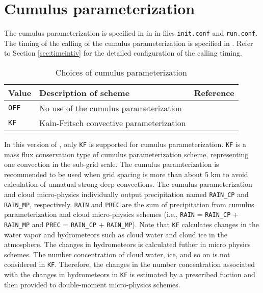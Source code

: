 
\section{Cumulus parameterization} \label{sec:basic_usel_cumulus}

The cumulus parameterization is specified in  in  in files \verb|init.conf| and \verb|run.conf|. The timing of the calling of the cumulus parameterization is specified in . Refer to Section \ref{sec:timeintiv} for the detailed configuration of the calling timing.

\begin{table}[h]
\begin{center}
  \caption{Choices of cumulus parameterization}
  \label{tab:nml_atm_cp}
  \begin{tabularx}{150mm}{lXX} \hline
    \rowcolor[gray]{0.9}  Value & Description of scheme & Reference\\ \hline
      \verb|OFF|  & No use of the cumulus parameterization &  \\
      \verb|KF|   & Kain-Fritsch convective parameterization & \citet{kain_1990,kain_2004} \\
    \hline
  \end{tabularx}
\end{center}
\end{table}

In this version of \scalerm, only \verb|KF| is supported for cumulus parameterization. \verb|KF| is a mass flux conservation type of cumulus parameterization scheme, representing one convection in the sub-grid scale.
The cumulus paramterization is recommended to be used when grid spacing is more than about 5 km to avoid calculation of unnatual strong deep convections.
The cumulus parameterization and cloud micro-physics individually output 
precipitation named \verb|RAIN_CP| and \verb|RAIN_MP|, respectively. 
\verb|RAIN| and \verb|PREC| are the sum of precipitation 
from cumulus parameterization and cloud micro-physics schemes 
(i.e., \verb|RAIN| = \verb|RAIN_CP| + \verb|RAIN_MP|
and \verb|PREC| = \verb|RAIN_CP| + \verb|RAIN_MP|).
Note that \verb|KF| calculates changes in the water vapor and
hydrometeors such as cloud water and cloud ice in the atmosphere.
The changes in hydrometeors is calculated futher in micro physics schemes.
The number concentration of cloud water, ice, and so on
is not considered in \verb|KF|.
Therefore, 
the changes in the number concentration 
associated with the changes in hydrometeors in \verb|KF|
is estimated by a prescribed fuction
and then
provided to double-moment micro-physics schemes.



